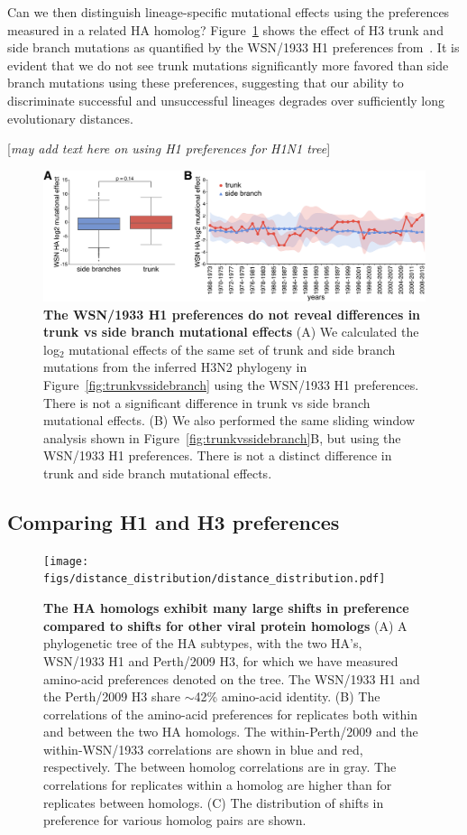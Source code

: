 \documentclass[11pt]{article}
\newcommand{\comment}[1]{{\color{red}[\textsl{#1}]}}
\begin{document}
Can we then distinguish lineage-specific mutational effects using the preferences measured in a related HA homolog?
Figure~\ref{fig:WSN_trunkvssidebranch} shows the effect of H3 trunk and side branch mutations as quantified by the WSN/1933 H1 preferences from~\cite{doud2016accurate}.
It is evident that we do not see trunk mutations significantly more favored than side branch mutations using these preferences, suggesting that our ability to discriminate successful and unsuccessful lineages degrades over sufficiently long evolutionary distances. 

\comment{may add text here on using H1 preferences for H1N1 tree}

\begin{figure}
\centerline{\includegraphics[width=\textwidth]{figs/WSN_trunkvssidebranch/WSN_trunkvssidebranch.pdf}}
\caption{\label{fig:WSN_trunkvssidebranch}
{\bf The WSN/1933 H1 preferences do not reveal differences in trunk vs side branch mutational effects}
(A) We calculated the log$_{2}$ mutational effects of the same set of trunk and side branch mutations from the inferred H3N2 phylogeny in Figure~\ref{fig:trunkvssidebranch} using the WSN/1933 H1 preferences.
There is not a significant difference in trunk vs side branch mutational effects.
(B) We also performed the same sliding window analysis shown in Figure~\ref{fig:trunkvssidebranch}B, but using the WSN/1933 H1 preferences.
There is not a distinct difference in trunk and side branch mutational effects.
}
\end{figure}


\subsection*{Comparing H1 and H3 preferences}

\begin{figure}
\centerline{\texttt{[image: figs/distance\_distribution/distance\_distribution.pdf]}}
\caption{\label{fig:distance_distribution}
{\bf The HA homologs exhibit many large shifts in preference compared to shifts for other viral protein homologs}
(A) A phylogenetic tree of the HA subtypes, with the two HA's, WSN/1933 H1 and Perth/2009 H3, for which we have measured amino-acid preferences denoted on the tree. 
The WSN/1933 H1 and the Perth/2009 H3 share $\sim$42\% amino-acid identity.
(B) The correlations of the amino-acid preferences for replicates both within and between the two HA homologs. 
The within-Perth/2009 and the within-WSN/1933 correlations are shown in blue and red, respectively.
The between homolog correlations are in gray.
The correlations for replicates within a homolog are higher than for replicates between homologs.
(C) The distribution of shifts in preference for various homolog pairs are shown.
}
\end{figure}
\end{document}
